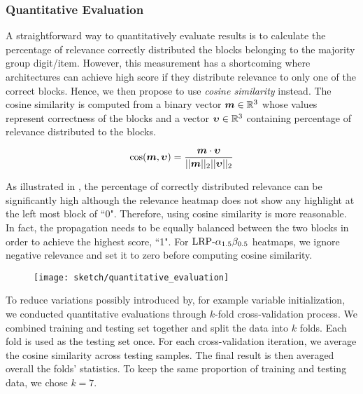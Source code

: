 \subsubsection{Quantitative Evaluation}
A straightforward way to quantitatively evaluate results is to calculate the percentage of relevance correctly distributed the blocks belonging to the majority group digit/item. However, this measurement has a shortcoming where architectures can achieve high score if they distribute relevance to only one of the correct blocks. Hence, we then propose to use \textit{cosine similarity} instead. The cosine similarity is computed from  a  binary  vector $\patvector{m} \in \mathbb{R}^3$  whose values represent correctness of the blocks and a vector $\patvector{\upsilon} \in \mathbb{R}^3$ containing percentage of  relevance distributed to the blocks. 

\begin{align}
\cos (\patvector{m}, \patvector{\upsilon}) = \frac{ \patvector{m} \cdot \patvector{\upsilon}}{ || \patvector{m}  ||_2 ||\patvector{\upsilon}   ||_2}	
\end{align}

As illustrated in \addfigure{\ref{fig:quantitative_evaluation}}, the percentage of correctly distributed relevance can be significantly high although the relevance heatmap does not show any highlight at the left most block of ``0". Therefore, using cosine similarity is more reasonable. In fact, the propagation needs to be equally balanced between the two blocks in order to achieve the highest score, ``1". For $\text{LRP-}\alpha_{1.5}\beta_{0.5}$ heatmaps, we ignore negative relevance and set it to zero before computing cosine similarity.

\begin{figure}[!htb]
\centering
\texttt{[image: sketch/quantitative\_evaluation]}
\label{fig:quantitative_evaluation}
\end{figure}

To reduce variations possibly introduced by, for example variable initialization, we conducted quantitative evaluations through $k$-fold cross-validation process. We combined  training and testing set together and split the data into $k$ folds. Each fold is used as the testing set once. For each cross-validation iteration, we average the cosine similarity across testing samples. The final result is then averaged overall the folds' statistics.  To keep the same proportion of training and testing data, we chose $k=7$. 




